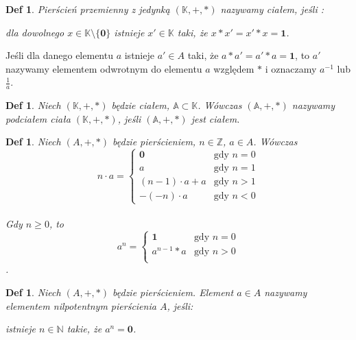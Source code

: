 \documentclass[12pt,a4paper]{article}
\newtheorem{definition}[twr]{Def}
\numberwithin{equation}{section}
\begin{document}
\begin{definition} \normalfont
Pierścień przemienny z jedynką $(\mathbb{K},+,*)$ nazywamy ciałem, jeśli :
    \begin{flushleft}
dla dowolnego $x \in \mathbb{K} \setminus \lbrace \textbf{0} \rbrace$ istnieje $x' \in \mathbb{K}$ taki, że $x*x'=x'*x=\textbf{1}$.
    \end{flushleft}
\end{definition}

Jeśli dla danego elementu $a$ istnieje $a' \in A$ taki, że $a*a'=a'*a=\textbf{1}$, to $a'$ nazywamy elementem odwrotnym do elementu $a$ względem $*$ i oznaczamy $a^{-1}$ lub ${\frac{1}{a}}$.


\begin{definition} \normalfont
Niech $(\mathbb{K},+,*)$ będzie ciałem, $\mathbb{A} \subset \mathbb{K}$. Wówczas $(\mathbb{A},+,*)$ nazywamy podciałem ciała $(\mathbb{K},+,*)$, jeśli $(\mathbb{A},+,*)$ jest ciałem.
\end{definition}


\begin{definition} \normalfont
Niech $(A,+,*)$ będzie pierścieniem, $n \in \mathbb{Z}$, $a \in A$. Wówczas
\\$$n \cdot a= \left\{ \begin{array}{ll}

\textbf{0} & \textrm{gdy $n = 0$}
\\
a & \textrm{gdy $n=1$}
\\
(n-1) \cdot a + a & \textrm{gdy $n>1$}
\\
-(-n) \cdot a & \textrm{gdy $n<0$}
\end{array} \right.$$
\\Gdy $n \geq 0$, to
\\$$a^{n}= \left\{ \begin{array}{ll}
\textbf{1} & \textrm{gdy $n = 0$}
\\
a^{n-1}*a & \textrm{gdy $n > 0$}
\\

\end{array} \right.$$.
\end{definition}

\begin{definition} \normalfont
Niech $(A,+,*)$ będzie pierścieniem. Element $a \in A$ nazywamy elementem nilpotentnym pierścienia $A$, jeśli:
    \begin{flushleft}
istnieje $n \in \mathbb{N}$ takie, że $a^{n}=\textbf{0}$.
    \end{flushleft}
\end{definition}
\end{document}
